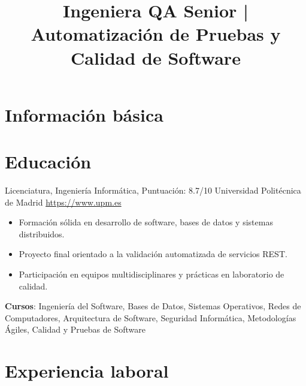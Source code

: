 \documentclass[a4paper, serif, 10pt]{moderncv}
\title{Ingeniera QA Senior | Automatización de Pruebas y Calidad de Software}
\begin{document}
\maketitle

\section{Información básica}

\section{Educación}

        {Licenciatura, Ingeniería Informática, Puntuación: 8.7/10}
        {Universidad Politécnica de Madrid}
        {\url{https://www.upm.es}}
        {}
        {\begin{itemize}
\item Formación sólida en desarrollo de software, bases de datos y sistemas distribuidos.
\item Proyecto final orientado a la validación automatizada de servicios REST.
\item Participación en equipos multidisciplinares y prácticas en laboratorio de calidad.
\end{itemize}
\textbf{Cursos}: Ingeniería del Software, Bases de Datos, Sistemas Operativos, Redes de Computadores, Arquitectura de Software, Seguridad Informática, Metodologías Ágiles, Calidad y Pruebas de Software}
\section{Experiencia laboral}
\end{document}
